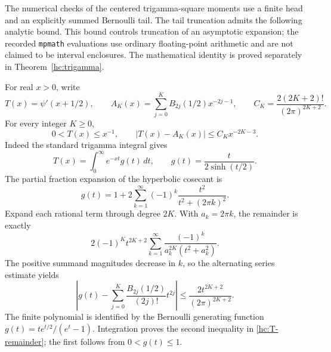 \label{hc:verification-bound}

The numerical checks of the centered trigamma-square moments use a finite
head and an explicitly summed Bernoulli tail. The tail truncation admits
the following analytic bound. This bound controls truncation of an
asymptotic expansion; the recorded \texttt{mpmath} evaluations use ordinary
floating-point arithmetic and are not claimed to be interval enclosures.
The mathematical identity is proved separately in
Theorem~\ref{hc:trigamma}.

For real $x>0$, write
\[
 T(x)=\psi'(x+1/2),\qquad
 A_K(x)=\sum_{j=0}^{K}B_{2j}(1/2)x^{-2j-1},\qquad
 C_K=\frac{2(2K+2)!}{(2\pi)^{2K+2}}.
\]
For every integer $K\ge0$,
\begin{equation}\label{hc:T-remainder}
 0<T(x)\le x^{-1},\qquad
 |T(x)-A_K(x)|\le C_Kx^{-2K-3}.
\end{equation}
Indeed the standard trigamma integral gives
\[
 T(x)=\int_0^\infty e^{-xt}g(t)\,dt,
 \qquad g(t)=\frac{t}{2\sinh(t/2)}.
\]
The partial fraction expansion of the hyperbolic cosecant
\cite[Eq.~4.36.5]{DLMFHyperbolic} is
\[
 g(t)=1+2\sum_{k=1}^{\infty}
             (-1)^k\frac{t^2}{t^2+(2\pi k)^2}.
\]
Expand each rational term through degree $2K$. With $a_k=2\pi k$,
the remainder is exactly
\[
 2(-1)^K t^{2K+2}\sum_{k=1}^{\infty}
              \frac{(-1)^k}{a_k^{2K}(t^2+a_k^2)}.
\]
The positive summand magnitudes decrease in $k$, so the alternating
series estimate yields
\[
 \left|g(t)-\sum_{j=0}^{K}
       \frac{B_{2j}(1/2)}{(2j)!}t^{2j}\right|
 \le \frac{2t^{2K+2}}{(2\pi)^{2K+2}}.
\]
The finite polynomial is identified by the Bernoulli generating
function $g(t)=te^{t/2}/(e^t-1)$. Integration proves the second
inequality in \eqref{hc:T-remainder}; the first follows from
$0<g(t)\le1$.

